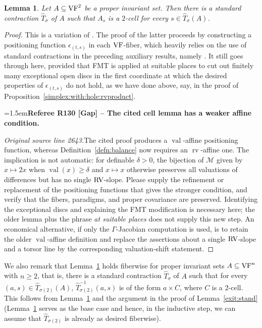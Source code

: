 \documentclass[12pt]{amsart}
\newcommand{\RefereeRemark}[4]{%
  \par\medskip\begingroup\normalfont\small\color{RefereePurple}%
  \emergencystretch=1.5em\noindent\textbf{Referee R#1 [#2] -- #3.}\par\nobreak\noindent #4\par
  \endgroup\medskip
}
\theoremstyle{plain}
\newtheorem{lem}[thm]{Lemma}
\theoremstyle{definition}
\theoremstyle{remark}
\numberwithin{equation}{section}
\theoremstyle{plain}
\newcommand{\VF}{\textup{VF}}
\newcommand{\RV}{\textup{RV}}
\newcommand{\MM}{\mdl M}
\newcommand{\0}{\emptyset}
\newcommand{\mdl}[1]{\mathcal{#1}}  %
\newcommand{\sub}{\subseteq}
\DeclareMathOperator{\rv}{rv}
\DeclareMathOperator{\vv}{val}
\begin{document}
\begin{lem}\label{decom:into:2:units}
Let  $A \sub \VF^2$ be a proper invariant set. Then there is a standard contraction $\hat T_\sigma$ of $A$ such that $A_s$ is a $2$-cell for every $s \in \hat T_\sigma(A)$.
\end{lem}
\begin{proof}
This is a variation of  \cite[Lemma~4.8]{Yin:int:acvf}. The proof of the latter proceeds by constructing a positioning function $\epsilon_{(t,s)}$ in each $\VF$-fiber, which heavily relies on the use of standard contractions in the preceding auxiliary results, namely \cite[Lemmas~4.2, 4.4]{Yin:int:acvf}.  It still goes through here, provided that FMT is applied at suitable places to cut out finitely many exceptional open discs in the first coordinate at which the desired properties of $\epsilon_{(t,s)}$ do not hold, as we have done above, say, in the proof of Proposition~\ref{simplex:with:hole:rvproduct}.

\RefereeRemark{130}{Gap}{The cited cell lemma has a weaker affine condition}{%
\textit{Original source line 2643.}\quad The cited proof produces a $\vv$-affine positioning function, whereas Definition~\ref{defn:balance} now requires an $\rv$-affine one. The implication is not automatic: for definable $\delta>0$, the bijection of $\MM$ given by $x\mapsto2x$ when $\vv(x)\geq\delta$ and $x\mapsto x$ otherwise preserves all valuations of differences but has no single $\RV$-slope. Please supply the refinement or replacement of the positioning functions that gives the stronger condition, and verify that the fibers, paradigms, and proper covariance are preserved. Identifying the exceptional discs and explaining the FMT modification is necessary here; the older lemma plus the phrase \emph{at suitable places} does not supply this new step. An economical alternative, if only the $\Gamma$-Jacobian computation is used, is to retain the older $\vv$-affine definition and replace the assertions about a single $\RV$-slope and a torsor line by the corresponding valuation-shift statement.
}
\end{proof}

We also remark that Lemma~\ref{decom:into:2:units} holds fiberwise for proper invariant sets $A \sub \VF^n$ with $n \geq 2$, that is, there is a standard contraction $\hat T_\sigma$ of $A$ such that for every $(a, s) \in \hat T_{\sigma(2)}(A)$, $\hat T_{\sigma(2)}^{-1}(a, s)$ is of the form $a \times C$, where $C$ is a $2$-cell. This follows from Lemma~\ref{decom:into:2:units} and the argument in the proof of  Lemma~\ref{exit:stand} (Lemma~\ref{decom:into:2:units} serves as the base case and hence, in the inductive step, we can assume that $\hat T_{\sigma(2)}$ is already as desired fiberwise).
\end{document}
